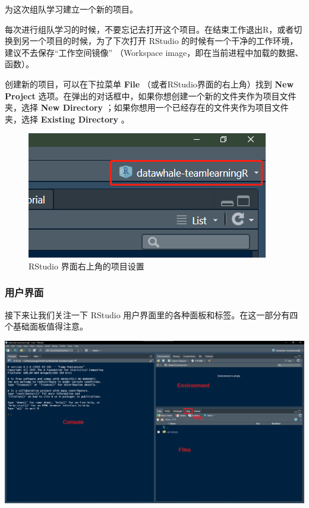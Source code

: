 \documentclass[]{ctexbook}
\begin{document}
为这次组队学习建立一个新的项目。

每次进行组队学习的时候，不要忘记去打开这个项目。在结束工作退出R，或者切换到另一个项目的时候，为了下次打开 RStudio 的时候有一个干净的工作环境，建议不去保存``工作空间镜像'' （Workspace image，即在当前进程中加载的数据、函数）。

创建新的项目，可以在下拉菜单 \textbf{File} （或者RStudio界面的右上角）找到 \textbf{New Project} 选项。在弹出的对话框中，如果你想创建一个新的文件夹作为项目文件夹，选择 \textbf{New Directory} ；如果你想用一个已经存在的文件夹作为项目文件夹，选择 \textbf{Existing Directory} 。

\begin{figure}
\centering
\includegraphics{./image/task00_project.png}
\caption[RStudio 界面右上角的项目设置]{RStudio 界面右上角的项目设置\footnotemark{}}
\end{figure}

\hypertarget{ux7528ux6237ux754cux9762}{%
\subsubsection{用户界面}\label{ux7528ux6237ux754cux9762}}

接下来让我们关注一下 RStudio 用户界面里的各种面板和标签。在这一部分有四个基础面板值得注意。

\includegraphics{./image/Rstudio.png}
\end{document}
